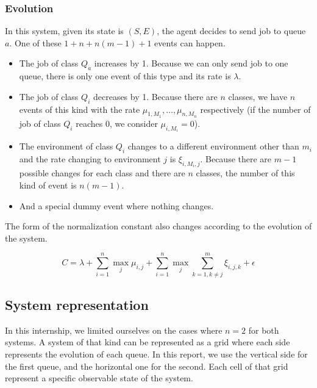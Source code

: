 \documentclass[
  a4paper, xcolor = usenames,dvipsnames]{article}
\providecommand{\tightlist}{%
  \setlength{\itemsep}{0pt}\setlength{\parskip}{0pt}}
\theoremstyle{definition}
\theoremstyle{definition}
\theoremstyle{definition}
\theoremstyle{definition}
\theoremstyle{remark}
\begin{document}
\hypertarget{evolution-1}{%
\subsubsection{Evolution}\label{evolution-1}}

In this system, given its state is \((S, E)\), the agent decides to send job to queue \(a\). One of these \(1 + n + n(m - 1) + 1\) events can happen.

\begin{itemize}
\tightlist
\item
  The job of class \(Q_{a}\) increases by 1. Because we can only send job to one queue, there is only one event of this type and its rate is \(\lambda\).
\item
  The job of class \(Q_{i}\) decreases by 1. Because there are \(n\) classes, we have \(n\) events of this kind with the rate \(\mu_{1, M_{1}}, \dots, \mu_{n, M_{n}}\) respectively (if the number of job of class \(Q_{i}\) reaches 0, we consider \(\mu_{i, M_{i}} = 0\)).
\item
  The environment of class \(Q_{i}\) changes to a different environment other than \(m_{i}\) and the rate changing to environment \(j\) is \(\xi_{i, M_{i}, j}\). Because there are \(m - 1\) possible changes for each class and there are \(n\) classes, the number of this kind of event is \(n(m - 1)\).
\item
  And a special dummy event where nothing changes.
\end{itemize}

The form of the normalization constant also changes according to the evolution of the system.

\[
C = \lambda + \sum_{i = 1}^{n} \max_{j} \mu_{i, j} + \sum_{i = 1}^{n} \max_{j} \sum_{k = 1, k \neq j}^{m} \xi_{i, j, k} + \epsilon
\]

\hypertarget{system-representation}{%
\subsection{System representation}\label{system-representation}}

In this internship, we limited ourselves on the cases where \(n = 2\) for both systems. A system of that kind can be represented as a grid where each side represents the evolution of each queue. In this report, we use the vertical side for the first queue, and the horizontal one for the second. Each cell of that grid represent a specific observable state of the system.
\end{document}
